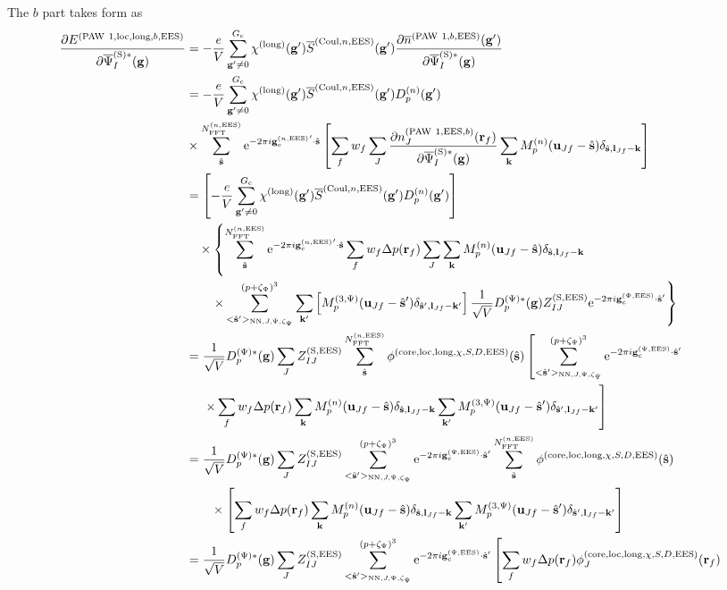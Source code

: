 \documentclass[paper=a4, fontsize=11pt]{article} %
\numberwithin{equation}{section} %
\numberwithin{figure}{section} %
\numberwithin{table}{section} %
\newcommand{\p}{\partial}
\newcommand{\ol}{\overline}
\newcommand{\bu}{{\bf{u}}}
\newcommand{\bl}{{\bf{l}}}
\newcommand{\bk}{{\bf{k}}}
\newcommand{\bs}{{\bf{s}}}
\newcommand{\bg}{{\bf{g}}}
\newcommand{\br}{{\bf{r}}}
\newcommand{\hs}{{\hat{\bf{s}}}}
\newcommand{\rS}{{\mathrm{S}}}
\newcommand{\rEES}{{\mathrm{EES}}}
\newcommand{\rcore}{{\mathrm{core}}}
\newcommand{\rNN}{{\mathrm{NN}}}
\newcommand{\re}{{\mathrm{e}}}
\newcommand{\rCo}{{\mathrm{Coul}}}
\newcommand{\rlong}{{\mathrm{long}}}
\newcommand{\rP}{{\mathrm{PAW}}}
\newcommand{\rlo}{{\mathrm{loc}}}
\newcommand{\gcpEES}{{\bg_c^{(\Psi,\rEES)}}}
\newcommand{\gcnEES}{{\bg_c^{(n,\rEES)}}}
\newcommand{\psigsc}{{\overline \Psi_I^{(\rS)*}(\bg)}}
\newcommand{\NFFTnEES}{{N^{(n,\rEES)}_{\mathrm{FFT}}}}
\newcommand{\Gc}{{G_{\mathrm{c}}}}
\newcommand{\Dpgc}{{D^{(\Psi)*}_p(\bg)}}
\newcommand{\Mp}{{M_p^{(3,\Psi)}}}
\newcommand{\pzp}{{(p+\zeta_{\Psi})^3}}
\newcommand{\hspJp}{{<\hs'>_{\rNN,J,\Psi,\zeta_\Psi}}}
\begin{document}
The $b$ part takes form as
\begin{equation}
\begin{split}
\frac{\p E^{(\rP\ 1,\rlo,\rlong,b,\rEES)}}{ \p \psigsc}
&= - \frac{e}{V} \sum_{\bg' \neq 0}^{\Gc} \chi^{(\rlong)}(\bg')  \ol S^{(\rCo,n,\rEES)}(\bg') \frac{\p \ol n^{(\rP\ 1,b,\rEES)}(\bg')}{\p \psigsc} \\
&=  - \frac{e}{V} \sum_{\bg' \neq 0}^{\Gc} \chi^{(\rlong)}(\bg')  \ol S^{(\rCo,n,\rEES)}(\bg') D_p^{(n)}(\bg') \\
&\times \sum_{\hat \bs}^\NFFTnEES \re^{-2\pi i\gcnEES' \cdot \hat\bs}\left[\sum_f w_f \sum_J \frac{\p n_J^{(\rP\ 1,\rEES,b)}(\br_f) }{\p \psigsc}\sum_{\bk}  M_p^{(n)}(\bu_{Jf}-\hat \bs)\delta_{\hat \bs,\bl_{Jf}-\bk}\right] \\
&= \left[-\frac{e}{V} \sum_{\bg' \neq 0}^{\Gc} \chi^{(\rlong)}(\bg')  \ol S^{(\rCo,n,\rEES)}(\bg') D_p^{(n)}(\bg') \right]\\ 
&\ \ \ \times \left\{\sum_{\hat \bs}^\NFFTnEES \re^{-2\pi i\gcnEES' \cdot \hat\bs} \sum_f w_f \Delta p(\br_f)\sum_J \sum_{\bk}  M_p^{(n)}(\bu_{Jf}-\hat \bs)\delta_{\hat \bs,\bl_{Jf}-\bk}\right. \\
&\left. \ \ \ \ \ \ \times \sum_{\hspJp}^\pzp \sum_{\bk'} \left[\Mp(\bu_{Jf}-\hat \bs')\delta_{\hat \bs',\bl_{Jf}-\bk'} \right] \frac{1}{\sqrt V} \Dpgc  Z_{IJ}^{(\rS,\rEES)} \re^{-2\pi i\gcpEES \cdot \hat\bs'} \right\} \\
&= \frac{1}{\sqrt V} \Dpgc  \sum_J Z_{IJ}^{(\rS,\rEES)}\sum_{\hat \bs}^\NFFTnEES  \phi^{(\rcore,\rlo,\rlong,\chi,S,D,\rEES)}(\hs)\left[\sum_{\hspJp}^\pzp \re^{-2\pi i\gcpEES \cdot \hat\bs'}\right.\\
&\ \ \ \ \left. \times \sum_f w_f \Delta p(\br_f)    \sum_{\bk}  M_p^{(n)}(\bu_{Jf}-\hat \bs)\delta_{\hat \bs,\bl_{Jf}-\bk} \sum_{\bk'} \Mp(\bu_{Jf}-\hat \bs')\delta_{\hat \bs',\bl_{Jf}-\bk'} \right]\\
&= \frac{1}{\sqrt V} \Dpgc  \sum_J Z_{IJ}^{(\rS,\rEES)} \sum_{\hspJp}^\pzp \re^{-2\pi i\gcpEES \cdot \hat\bs'} \sum_{\hat \bs}^\NFFTnEES \phi^{(\rcore,\rlo,\rlong,\chi,S,D,\rEES)}(\hs) \\
&\ \ \ \ \ \ \times \left[\sum_f w_f \Delta p(\br_f) \sum_{\bk}  M_p^{(n)}(\bu_{Jf}-\hat \bs)\delta_{\hat \bs,\bl_{Jf}-\bk} \sum_{\bk'} \Mp(\bu_{Jf}-\hat \bs')\delta_{\hat \bs',\bl_{Jf}-\bk'}\right]\\
&= \frac{1}{\sqrt{V}} \Dpgc \sum_J Z_{IJ}^{(\rS,\rEES)}  \sum_{\hspJp}^\pzp \re^{-2\pi i\gcpEES \cdot \hat\bs'} \left[\sum_f w_f \Delta p(\br_f) \phi_J^{(\rcore,\rlo,\rlong,\chi,S,D,\rEES)}(\br_f) \right. \\

\end{split}
\end{equation}
\end{document}
